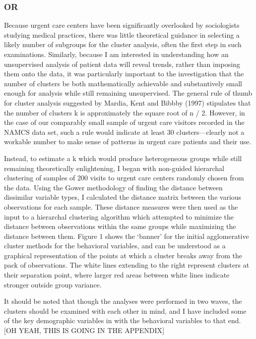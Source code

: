 \documentclass[12pt,twoside]{reedthesis}
\begin{document}
  \subsubsection*{OR}\label{or}
  
  Because urgent care centers have been significantly overlooked by
  sociologists studying medical practices, there was little theoretical
  guidance in selecting a likely number of subgroups for the cluster
  analysis, often the first step in such examinations. Similarly, because
  I am interested in understanding how an unsupervised analysis of patient
  data will reveal trends, rather than imposing them onto the data, it was
  particularly important to the investigation that the number of clusters
  be both mathematically achievable and substantively small enough for
  analysis while still remaining unsupervised. The general rule of thumb
  for cluster analysis suggested by Mardia, Kent and Bibbby (1997)
  stipulates that the number of clusters k is approximately the square
  root of n / 2. However, in the case of our comparably small sample of
  urgent care visitors recorded in the NAMCS data set, such a rule would
  indicate at least 30 clusters---clearly not a workable number to make
  sense of patterns in urgent care patients and their use.
  
  Instead, to estimate a k which would produce heterogeneous groups while
  still remaining theoretically enlightening, I began with non-guided
  hierarchal clustering of samples of 200 visits to urgent care centers
  randomly chosen from the data. Using the Gower methodology of finding
  the distance between dissimilar variable types, I calculated the
  distance matrix between the various observations for each sample. These
  distance measures were then used as the input to a hierarchal clustering
  algorithm which attempted to minimize the distance between observations
  within the same groups while maximizing the distance between them.
  Figure 1 shows the `banner' for the initial agglomerative cluster
  methods for the behavioral variables, and can be understood as a
  graphical representation of the points at which a cluster breaks away
  from the pack of observations. The white lines extending to the right
  represent clusters at their separation point, where larger red areas
  between white lines indicate stronger outside group variance.
  
  It should be noted that though the analyses were performed in two waves,
  the clusters should be examined with each other in mind, and I have
  included some of the key demographic variables in with the behavioral
  variables to that end. {[}OH YEAH, THIS IS GOING IN THE APPENDIX{]}
  
\end{document}
